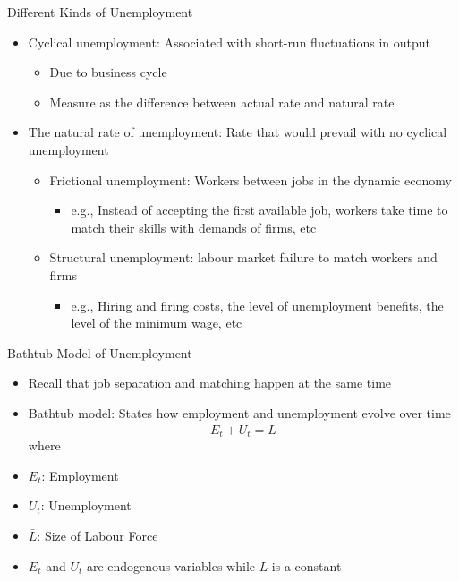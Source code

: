 \documentclass[aspectratio=1610]{beamer}
\begin{document}
\begin{frame}[wide]{Different Kinds of Unemployment}
	\begin{itemize}
		\item Cyclical unemployment: Associated with short-run fluctuations in output
		\vspace{1mm}
		\begin{itemize}
			\item Due to business cycle
			\item Measure as the difference between actual rate and natural rate
		\end{itemize}
		\item The natural rate of unemployment:	Rate that would prevail with no cyclical unemployment
		\vspace{1mm}
		\begin{itemize}
			\item Frictional unemployment: Workers between jobs in the dynamic economy
			\begin{itemize}
				\item e.g., Instead of accepting the first available job, workers take time to match their skills with demands of firms, etc
			\end{itemize}
			\item Structural unemployment: labour market failure to match workers and firms
			\begin{itemize}
				\item e.g., Hiring and firing costs, the level of unemployment benefits, the level of the minimum wage, etc
				
			\end{itemize}
		\end{itemize}
		
	\end{itemize}
\end{frame}

\begin{frame}[wide]{Bathtub Model of Unemployment}
	\begin{itemize}
		\item Recall that job separation and matching happen  at the same time
		\item Bathtub model: States how employment and unemployment evolve over time
		\[E_t + U_t = \bar{L}\]
		where
		\item[] $E_t$: Employment
		\item[] $U_t$: Unemployment
		\item[] $\bar{L}$: Size of Labour Force
		\item $E_t$ and $U_t$ are endogenous variables while $\bar{L}$ is a constant
	\end{itemize}
\end{frame}
\end{document}
